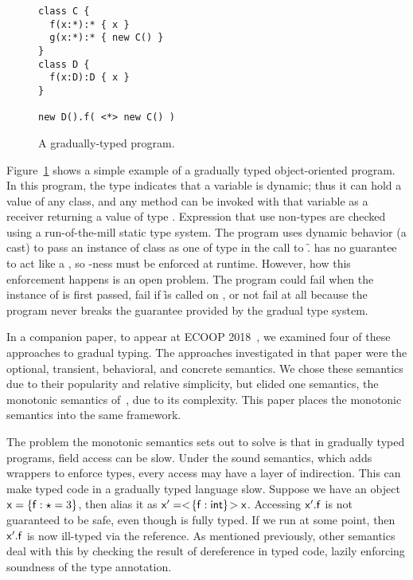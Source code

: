 \documentclass[sigconf]{acmart}
\begin{document}
\begin{figure}[h]
\begin{lstlisting}
class C { 
  f(x:*):* { x } 
  g(x:*):* { new C() }
}
class D { 
  f(x:D):D { x }
}

new D().f( <*> new C() )
\end{lstlisting}
\caption{A gradually-typed program.}
\label{fig:simpleprog}
\end{figure}

Figure~\ref{fig:simpleprog} shows a simple example of a gradually typed
object-oriented program. In this program, the type \any indicates that a
variable is dynamic; thus it can hold a value of any class, and any method
can be invoked with that variable as a receiver returning a value of type
\any. Expression that use non-\any types are checked using a run-of-the-mill
static type system. The program uses dynamic behavior (a cast) to pass an
instance of class \C as one of type \D in the call to \f. \C has no
guarantee to act like a \D, so \D-ness must be enforced at runtime. However,
how this enforcement happens is an open problem. The program could fail when
the instance of \C is first passed, fail if \f is called on \x, or not fail
at all because the program never breaks the guarantee provided by the
gradual type system.

In a companion paper, to appear at ECOOP 2018~\cite{us}, we examined four of
these approaches to gradual typing.  The approaches investigated in that
paper were the optional, transient, behavioral, and concrete semantics. We
chose these semantics due to their popularity and relative simplicity, but
elided one semantics, the monotonic semantics of~\cite{siek14}, due to its
complexity. This paper places the monotonic semantics into the same
framework.

The problem the monotonic semantics sets out to solve is that in gradually
typed programs, field access can be slow. Under the sound semantics, which
adds wrappers to enforce types, every access may have a layer of
indirection. This can make typed code in a gradually typed language slow.
Suppose we have an object $\x = \{ \f:\any = 3 \}$, then alias it as $\xp =
\SubCast{\{ \f:\xt{int} \}}\x$. Accessing $\xp.\f$ is not guaranteed to be
safe, even though \xp is fully typed. If we run  at some
point, then $\xp.\f$ is now ill-typed via the reference. As mentioned
previously, other semantics deal with this by checking the result of
dereference in typed code, lazily enforcing soundness of the type
annotation. 
\end{document}
